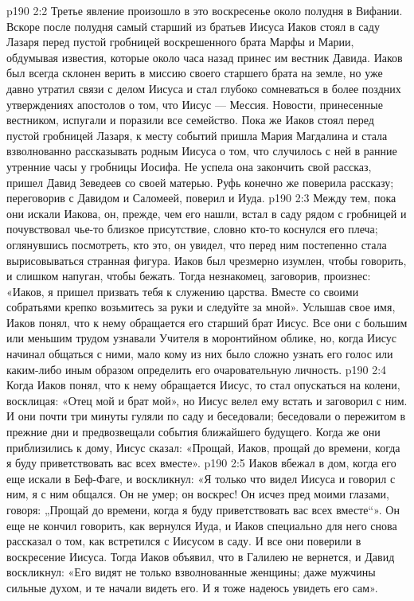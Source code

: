 \vs p190 2:2 Третье явление произошло в это воскресенье около полудня в Вифании. Вскоре после полудня самый старший из братьев Иисуса Иаков стоял в саду Лазаря перед пустой гробницей воскрешенного брата Марфы и Марии, обдумывая известия, которые около часа назад принес им вестник Давида. Иаков был всегда склонен верить в миссию своего старшего брата на земле, но уже давно утратил связи с делом Иисуса и стал глубоко сомневаться в более поздних утверждениях апостолов о том, что Иисус --- Мессия. Новости, принесенные вестником, испугали и поразили все семейство. Пока же Иаков стоял перед пустой гробницей Лазаря, к месту событий пришла Мария Магдалина и стала взволнованно рассказывать родным Иисуса о том, что случилось с ней в ранние утренние часы у гробницы Иосифа. Не успела она закончить свой рассказ, пришел Давид Зеведеев со своей матерью. Руфь конечно же поверила рассказу; переговорив с Давидом и Саломеей, поверил и Иуда.
\vs p190 2:3 Между тем, пока они искали Иакова, он, прежде, чем его нашли, встал в саду рядом с гробницей и почувствовал чье\hyp{}то близкое присутствие, словно кто\hyp{}то коснулся его плеча; оглянувшись посмотреть, кто это, он увидел, что перед ним постепенно стала вырисовываться странная фигура. Иаков был чрезмерно изумлен, чтобы говорить, и слишком напуган, чтобы бежать. Тогда незнакомец, заговорив, произнес: «Иаков, я пришел призвать тебя к служению царства. Вместе со своими собратьями крепко возьмитесь за руки и следуйте за мной». Услышав свое имя, Иаков понял, что к нему обращается его старший брат Иисус. Все они с большим или меньшим трудом узнавали Учителя в моронтийном облике, но, когда Иисус начинал общаться с ними, мало кому из них было сложно узнать его голос или каким\hyp{}либо иным образом определить его очаровательную личность.
\vs p190 2:4 Когда Иаков понял, что к нему обращается Иисус, то стал опускаться на колени, восклицая: «Отец мой и брат мой», но Иисус велел ему встать и заговорил с ним. И они почти три минуты гуляли по саду и беседовали; беседовали о пережитом в прежние дни и предвозвещали события ближайшего будущего. Когда же они приблизились к дому, Иисус сказал: «Прощай, Иаков, прощай до времени, когда я буду приветствовать вас всех вместе».
\vs p190 2:5 Иаков вбежал в дом, когда его еще искали в Беф\hyp{}Фаге, и воскликнул: «Я только что видел Иисуса и говорил с ним, я с ним общался. Он не умер; он воскрес! Он исчез пред моими глазами, говоря: „Прощай до времени, когда я буду приветствовать вас всех вместе“». Он еще не кончил говорить, как вернулся Иуда, и Иаков специально для него снова рассказал о том, как встретился с Иисусом в саду. И все они поверили в воскресение Иисуса. Тогда Иаков объявил, что в Галилею не вернется, и Давид воскликнул: «Его видят не только взволнованные женщины; даже мужчины сильные духом, и те начали видеть его. И я тоже надеюсь увидеть его сам».
